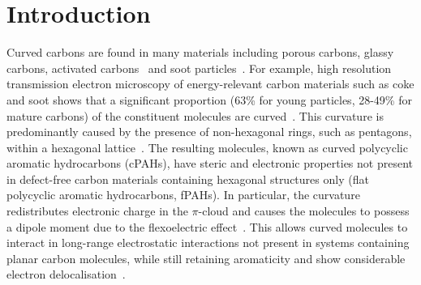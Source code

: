 %
\section{Introduction}
\label{sec:Introduction}

Curved carbons are found in many materials including porous carbons, glassy carbons, activated carbons~\cite{Harris2005new,Martin2019topology,Martin2019nanostructure} and soot particles~\cite{Martin2018flexo}. For example, high resolution transmission electron microscopy of energy-relevant carbon materials such as coke and soot shows that a significant proportion (63\% for young particles, 28-49\% for mature carbons) of the constituent molecules are curved~\cite{wang2017improved,zhong2018structural,Martin2018flexo}. 
This curvature is predominantly caused by the presence of non-hexagonal rings, such as pentagons, within a hexagonal lattice~\cite{Martin2018polar}. The resulting molecules, known as curved polycyclic aromatic hydrocarbons (cPAHs), have steric and electronic properties not present in defect-free carbon materials containing hexagonal structures only (flat polycyclic aromatic hydrocarbons, fPAHs). In particular, the curvature redistributes electronic charge in the $\pi$-cloud and causes the molecules to possess a dipole moment due to the flexoelectric effect~\cite{Martin2017}. This allows curved molecules to interact in long-range electrostatic interactions not present in systems containing planar carbon molecules, while still retaining aromaticity and show considerable electron delocalisation~\cite{grabowsky2010electron,Dobrowolski2011aromatic}.

